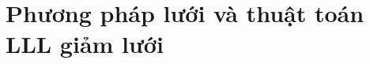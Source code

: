 \documentclass{beamer}
\begin{document}






\section{Phương pháp lưới và thuật toán LLL giảm lưới}
\end{document}
